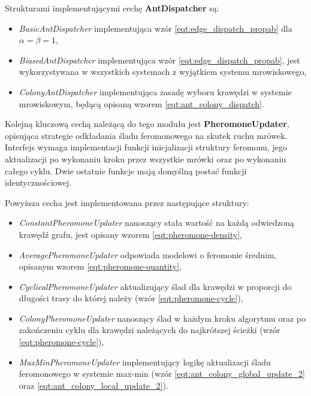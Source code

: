 {{{            Strukturami implementującymi cechę \textbf{AntDispatcher} są:

            \begin{itemize}
                \item \textit{BasicAntDispatcher} implementująca wzór \ref{eqt:edge_dispatch_propab} dla $\alpha = \beta
                = 1$,
                \item \textit{BiasedAntDispatcher} implementująca wzór \ref{eqt:edge_dispatch_propab}, jest
                wykorzystywana w wszystkich systemach z wyjątkiem systemu mrowiskowego,
                \item \textit{ColonyAntDispatcher} implementująca zasadę wyboru krawędzi w systemie mrowiskowym, będącą opisaną wzorem \ref{eqt:ant_colony_dispatch}.
            \end{itemize}

            Kolejną kluczową cechą należącą do tego modułu jest \textbf{PheromoneUpdater}, opisująca strategie
            odkładania śladu feromonowego na skutek ruchu mrówek. Interfejs wymaga implementacji funkcji inicjalizacji
            struktury feromonu, jego aktualizacji po wykonaniu kroku przez wszystkie mrówki oraz po wykonaniu całego
            cyklu. Dwie ostatnie funkcje mają domyślną postać funkcji identycznościowej.

            Powyższa cecha jest implementowana przez następujące struktury:

            \begin{itemize}
                \item \textit{ConstantPheromoneUpdater} nanoszący stała wartość na każdą odwiedzoną krawędź grafu, jest
                opisany wzorem \ref{eqt:pheromone-density},
                \item \textit{AveragePheromoneUpdater} odpowiada modelowi o feromonie średnim, opisanym wzorem \ref{eqt:pheromone-quantity},
                \item \textit{CyclicalPheromoneUpdater} aktualizujący ślad dla krawędzi w proporcji do długości trasy do
                której należy (wzór \ref{eqt:pheromone-cycle}),
                \item \textit{ColonyPheromoneUpdater} nanoszący ślad w każdym kroku algorytmu oraz po zakończeniu cyklu
                dla krawędzi należących do najkrótszej ścieżki (wzór \ref{eqt:pheromone-cycle}),
                \item \textit{MaxMinPheromoneUpdater} implementujący logikę aktualizacji śladu feromonowego w systemie
                max-min (wzór \ref{eqt:ant_colony_global_update_2} oraz \ref{eqt:ant_colony_local_update_2}).
            \end{itemize}

}}}
